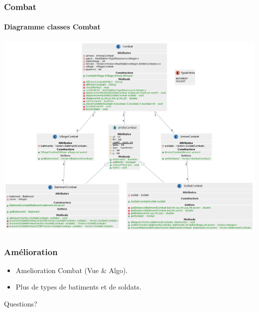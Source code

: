 \documentclass{beamer}
\begin{document}
    \begin{frame}
        \frametitle{Combat}
        \framesubtitle{Diagramme classes Combat}
        \begin{center}
            \includegraphics[scale=0.2]{images/ClassesCombat.png}
        \end{center}
    \end{frame}

    \begin{frame}
        \frametitle{Amélioration}
        \begin{itemize}
            \item Amelioration Combat (Vue & Algo).
            \item Plus de types de batiments et de soldats.
        \end{itemize}
    \end{frame}

    \begin{frame}
        \begin{center}
            Questions?
        \end{center}
    \end{frame}
\end{document}
